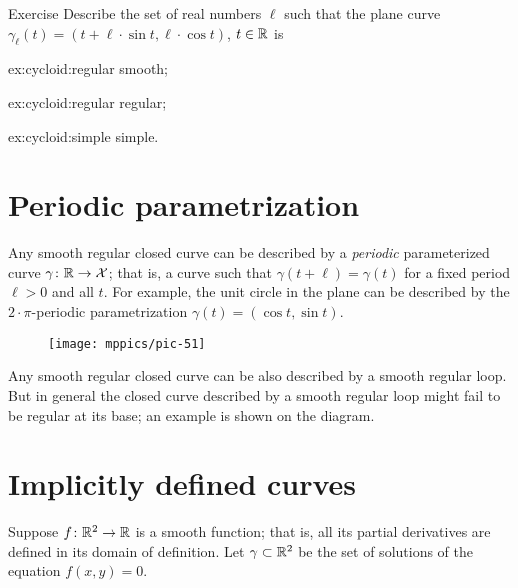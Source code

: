 \begin{thm}{Exercise}\label{ex:cycloid}
Describe the set of real numbers $\ell$
such that the plane curve $\gamma_\ell (t)= (t+\ell \cdot \sin t,\ell \cdot \cos t)$, $t\in\mathbb{R}$ is

\begin{subthm}{ex:cycloid:regular}
smooth; %
\end{subthm}

\begin{subthm}{ex:cycloid:regular}
regular;
\end{subthm}

\begin{subthm}{ex:cycloid:simple}
simple.
\end{subthm}

\end{thm}

\section{Periodic parametrization}

Any smooth regular closed curve can be described by a \emph{periodic} parameterized curve $\gamma\colon \mathbb{R}\to \mathcal{X}$; that is, a curve such that $\gamma(t+\ell)=\gamma(t)$ for a fixed period $\ell > 0$ and all $t$.
For example, the unit circle in the plane can be described by the $2{\cdot}\pi$-periodic parametrization $\gamma(t)=(\cos t,\sin t)$.

{

\begin{wrapfigure}{o}{17 mm}
\vskip-0mm
\centering
\texttt{[image: mppics/pic-51]}
\end{wrapfigure}

Any smooth regular closed curve can be also described by a smooth regular loop.
But in general the closed curve described by a smooth regular loop might fail to be regular at its base; an example is shown on the diagram.

}

\section{Implicitly defined curves}

Suppose $f\colon\mathbb{R}^2\to \mathbb{R}$ is a smooth function; 
that is, all its partial derivatives are defined in its domain of definition.
Let $\gamma\subset \mathbb{R}^2$ be the set of solutions of the equation $f(x,y)=0$.

